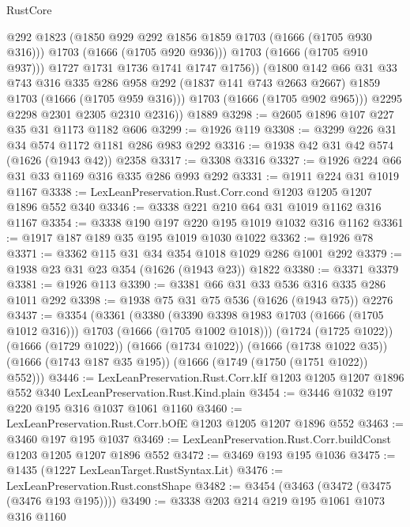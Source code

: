 \begin{lexlean}{RustCore}
\begin{coremodule}
                  @292
                  @1823
                  (@1850 @929 @292 @1856 @1859 @1703 (@1666 (@1705 @930 @316)))
                  @1703
                  (@1666 (@1705 @920 @936)))
                @1703
                (@1666 (@1705 @910 @937)))
              @1727
              @1731
              @1736
              @1741
              @1747
              @1756))
          (@1800
            @142
            @66
            @31
            @33
            @743
            @316
            @335
            @286
            @958
            @292
            (@1837 @141 @743 @2663 @2667)
            @1859
            @1703
            (@1666 (@1705 @959 @316)))
          @1703
          (@1666 (@1705 @902 @965)))
        @2295
        @2298
        @2301
        @2305
        @2310
        @2316))
    @1889
@3298 := @2605 @1896 @107 @227 @35 @31 @1173 @1182 @606
@3299 := @1926 @119
@3308 := @3299 @226 @31 @34 @574 @1172 @1181 @286 @983 @292
@3316 := @1938 @42 @31 @42 @574 (@1626 (@1943 @42)) @2358
@3317 := @3308 @3316
@3327 := @1926 @224 @66 @31 @33 @1169 @316 @335 @286 @993 @292
@3331 := @1911 @224 @31 @1019 @1167
@3338 := LexLeanPreservation.Rust.Corr.cond @1203 @1205 @1207 @1896 @552 @340
@3346 := @3338 @221 @210 @64 @31 @1019 @1162 @316 @1167
@3354 := @3338 @190 @197 @220 @195 @1019 @1032 @316 @1162
@3361 := @1917 @187 @189 @35 @195 @1019 @1030 @1022
@3362 := @1926 @78
@3371 := @3362 @115 @31 @34 @354 @1018 @1029 @286 @1001 @292
@3379 := @1938 @23 @31 @23 @354 (@1626 (@1943 @23)) @1822
@3380 := @3371 @3379
@3381 := @1926 @113
@3390 := @3381 @66 @31 @33 @536 @316 @335 @286 @1011 @292
@3398 := @1938 @75 @31 @75 @536 (@1626 (@1943 @75)) @2276
@3437 := @3354
    (@3361
      (@3380 (@3390 @3398 @1983 @1703 (@1666 (@1705 @1012 @316))) @1703 (@1666 (@1705 @1002 @1018)))
      (@1724 (@1725 @1022))
      (@1666 (@1729 @1022))
      (@1666 (@1734 @1022))
      (@1666 (@1738 @1022 @35))
      (@1666 (@1743 @187 @35 @195))
      (@1666 (@1749 (@1750 (@1751 @1022)) @552)))
@3446 := LexLeanPreservation.Rust.Corr.kIf
    @1203
    @1205
    @1207
    @1896
    @552
    @340
    LexLeanPreservation.Rust.Kind.plain
@3454 := @3446 @1032 @197 @220 @195 @316 @1037 @1061 @1160
@3460 := LexLeanPreservation.Rust.Corr.bOfE @1203 @1205 @1207 @1896 @552
@3463 := @3460 @197 @195 @1037
@3469 := LexLeanPreservation.Rust.Corr.buildConst @1203 @1205 @1207 @1896 @552
@3472 := @3469 @193 @195 @1036
@3475 := @1435 (@1227 LexLeanTarget.RustSyntax.Lit)
@3476 := LexLeanPreservation.Rust.constShape
@3482 := @3454 (@3463 (@3472 (@3475 (@3476 @193 @195))))
@3490 := @3338 @203 @214 @219 @195 @1061 @1073 @316 @1160

\end{coremodule}
\end{lexlean}
